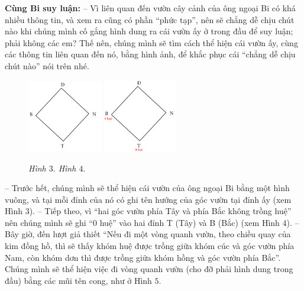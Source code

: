	\vskip 0.1cm
	\textbf{\color{toancuabi}Cùng Bi suy luận:}
	\vskip 0.1cm
	-- Vì liên quan đến vườn cây cảnh của ông ngoại Bi có khá nhiều thông tin, và xem ra cũng có phần “phức tạp”, nên sẽ chẳng dễ chịu chút nào khi chúng mình cố gắng hình dung ra cái vườn ấy ở trong đầu để suy luận; phải không các em? Thế nên, chúng mình sẽ tìm cách thể hiện cái vườn ấy, cùng các thông tin liên quan đến nó, bằng hình ảnh, để khắc phục cái “chẳng dễ chịu chút nào” nói trên nhé.
	\vskip 0.1cm
	\begin{figure}
		\vspace*{-15pt}
		\centering
		\captionsetup{labelformat=empty, justification=centering}
		\includegraphics[width= 0.29\textwidth]{pic3}
		\includegraphics[width=0.29\textwidth]{pic4}
		\caption{\small\textit{Hình $3.$ \hspace*{50pt}Hình $4.$}}
		\vspace*{-15pt}
	\end{figure}
	-- Trước hết, chúng mình sẽ thể hiện cái vườn của ông ngoại Bi bằng một hình vuông, và tại mỗi đỉnh của nó có ghi tên hướng của góc vườn tại đỉnh ấy (xem Hình $3$).
	\vskip 0.15cm
	-- Tiếp theo, vì “hai góc vườn phía Tây và phía Bắc không trồng huệ” nên chúng mình sẽ ghi “0 huệ” vào hai đỉnh T (Tây) và B (Bắc) (xem Hình $4$).
	\vskip 0.15cm
	-- Bây giờ, đến lượt giả thiết “Nếu đi một vòng quanh vườn, theo chiều quay của kim đồng hồ, thì sẽ thấy khóm huệ được trồng giữa khóm cúc và góc vườn phía Nam, còn khóm dơn thì được trồng giữa khóm hồng và góc vườn phía Bắc”. Chúng mình sẽ thể hiện việc đi vòng quanh vườn (cho đỡ phải hình dung trong đầu) bằng các mũi tên cong, như ở Hình $5$.
	\vskip 0.1cm
